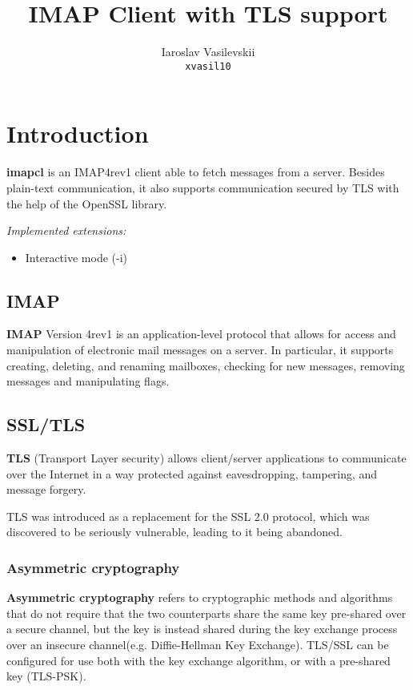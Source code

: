 \documentclass[a4]{report}
\title{IMAP Client with TLS support}
\author{Iaroslav Vasilevskii\\\texttt{xvasil10}}
\begin{document}
\maketitle
\tableofcontents

\chapter{Introduction}

{\Large\textbf{imapcl}} is an IMAP4rev1\cite{rfc3501} client able to fetch messages from a server. Besides plain-text communication, it also supports communication secured by TLS with the help of the OpenSSL library.

\textit{Implemented extensions:}
\begin{itemize}
  \item Interactive mode (-i)
\end{itemize}

\section{IMAP}

\textbf{IMAP} Version 4rev1 is an application-level protocol that allows for access and manipulation of electronic mail messages on a server. In particular, it supports creating, deleting, and renaming mailboxes, checking for new messages, removing messages and manipulating flags\cite{rfc3501}.

\section{SSL/TLS}

\textbf{TLS} (Transport Layer security) allows client/server applications to communicate over the Internet in a way protected against eavesdropping, tampering, and message forgery\cite{rfc8446}.

TLS was introduced as a replacement for the SSL 2.0 protocol, which was discovered to be seriously vulnerable, leading to it being abandoned\cite{rfc6176}.

\subsection{Asymmetric cryptography}

\textbf{Asymmetric cryptography} refers to cryptographic methods and algorithms that do not require that the two counterparts share the same key pre-shared over a secure channel, but the key is instead shared during the key exchange process over an insecure channel(e.g. Diffie-Hellman Key Exchange). TLS/SSL can be configured for use both with the key exchange algorithm, or with a pre-shared key (TLS-PSK)\cite{rfc8446}.
\end{document}
